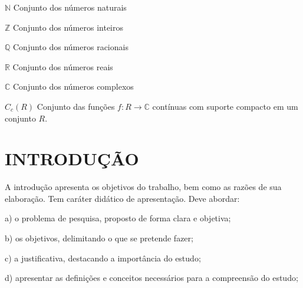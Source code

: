 \documentclass[
	12pt,				%
	oneside,			%
	a4paper,			%
	english,			%
	french,				%
	spanish,			%
	brazil,				%
	]{abntex2}
\newcommand{\C}{\ensuremath {\mathbb{C}} }
\theoremstyle{plain}
\theoremstyle{definition}
\begin{document}
\renewcommand\listadesimbolosname{{\fontsize{12pt}{\baselineskip}\normalfont \bfseries LISTA DE SÍMBOLOS}}
\begin{simbolos}
  \item[$ \mathbb{N} $] Conjunto dos números naturais 
  \item[$ \mathbb{Z} $] Conjunto dos números inteiros 
  \item[$ \mathbb{Q} $] Conjunto dos números racionais 
  \item[$ \mathbb{R} $] Conjunto dos números reais 
  \item[$ \mathbb{C} $] Conjunto dos números complexos
  \item[$ C_c(R) $] Conjunto das funções $f: R \rightarrow \C$ contínuas com suporte compacto em um conjunto $R$.
\end{simbolos}


\renewcommand\contentsname{{\fontsize{12pt}{\baselineskip}\normalfont \bfseries SUMÁRIO}}
\pdfbookmark[0]{\contentsname}{toc}
\tableofcontents*
\cleardoublepage




\textual

  \pagestyle{meuestilo}

\chapter{INTRODUÇÃO} %


A introdução apresenta os objetivos do trabalho, bem como as razões de sua elaboração. Tem caráter didático de apresentação.
Deve abordar:

    a) o problema de pesquisa, proposto de forma clara e objetiva;
    
    b) os objetivos, delimitando o que se pretende fazer;
    
    c) a justificativa, destacando a importância do estudo;
    
    d) apresentar as definições e conceitos necessários para a compreensão do estudo;
    
\end{document}
